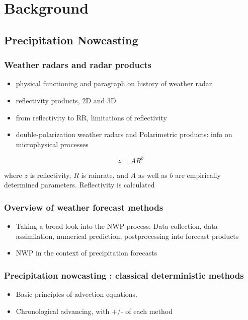 \chapter{Background}
\label{chapter:background} 

\section{Precipitation Nowcasting}

\subsection{Weather radars and radar products}


\begin{itemize}
	\item physical functioning and paragraph on history of weather radar
	\item reflectivity products, 2D and 3D
	
	\item from reflectivity to RR, limitations of reflectivity
	\item double-polarization weather radars and Polarimetric products: info on microphysical processes
\end{itemize}

\begin{equation}
\label{eq:z-r}
	z = AR^b
\end{equation}

where $z$ is reflectivity, $R$ is rainrate, and $A$ as well as $b$ are empirically determined parameters. Reflectivity is calculated 

\subsection{Overview of weather forecast methods}
\begin{itemize}
	\item Taking a broad look into the NWP process: Data collection, data assimilation, numerical prediction, postprocessing into forecast products
	\item NWP in the context of precipitation forecasts
\end{itemize}


\subsection{Precipitation nowcasting : classical deterministic methods}
\begin{itemize}
	\item Basic principles of advection equations. 
	\item Chronological advancing, with +/- of each method
\end{itemize}

